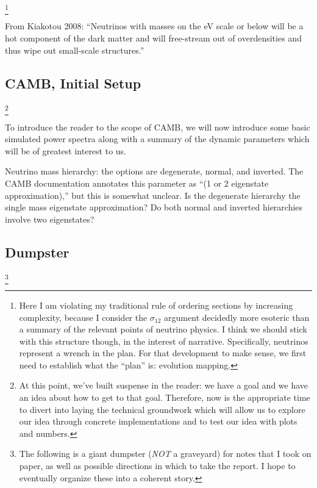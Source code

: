 \documentclass[11pt]{article}
\begin{document}
\footnote{
    Here I am violating my traditional rule of ordering sections by
    increasing complexity, because I consider the $\sigma_{12}$ argument
    decidedly more esoteric than a summary of the relevant points of neutrino
    physics. I think we should stick with this structure though, in the
    interest of narrative. Specifically, neutrinos represent a wrench in the
    plan. For that development to make sense, we first need to establish what
    the ``plan'' is: evolution mapping.
}

From Kiakotou 2008: ``Neutrinos with masses on the eV scale or below will be a
hot component of the dark matter and will free-stream out of overdensities and
thus wipe out small-scale structures.''

\begin{centering}
\section{CAMB, Initial Setup}
\end{centering}

\footnote{
    At this point, we've built suspense in the reader: we have a goal and
    we have an idea about how to get to that goal. Therefore, now is the
    appropriate time to divert into laying the technical groundwork which
    will allow us to explore our idea through concrete implementations and
    to test our idea with plots and numbers.
}

To introduce the reader to the scope of CAMB, we will now introduce
some basic simulated power spectra along with a summary of the dynamic
parameters which will be of greatest interest to us.

Neutrino mass hierarchy: the options are degenerate, normal, and inverted.
The CAMB documentation annotates this parameter as ``(1 or 2 eigenstate
approximation),'' but this is somewhat unclear. Is the degenerate
hierarchy the single mass eigenstate approximation? Do both normal
and inverted hierarchies involve two eigenstates?

\begin{centering}
\section{Dumpster}
\end{centering}

\footnote{
    The following is a giant dumpster (\textit{NOT} a graveyard) for notes
    that I took on paper, as well as possible directions in which to take the
    report. I hope to eventually organize these into a coherent story.
}
\end{document}
